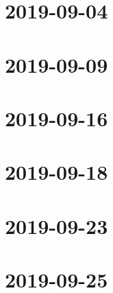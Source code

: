 \documentclass{book}
\begin{document}
\chapter{}


\chapter{}


\chapter{}


\chapter{}


\chapter{}


\chapter{2019-09-04}


\chapter{2019-09-09}


\chapter{2019-09-16}


\chapter{2019-09-18}


\chapter{2019-09-23}


\chapter{2019-09-25}

\end{document}
